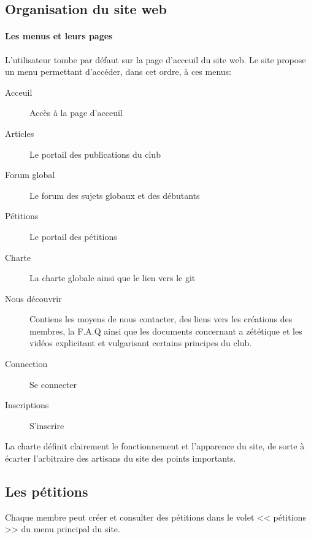 \documentclass[a4paper,12pt]{article}
\begin{document}
\subsection{Organisation du site web}
\paragraph{Les menus et leurs pages}
L'utilisateur tombe par défaut sur la page d'acceuil du site web. Le site propose un menu permettant d'accéder, dans cet ordre, à ces menus:
\begin{description}
 \item [Acceuil] Accès à la page d'acceuil
 \item [Articles] Le portail des publications du club
 \item [Forum global] Le forum des sujets globaux et des débutants
 \item [Pétitions] Le portail des pétitions
 \item [Charte] La charte globale ainsi que le lien vers le git
 \item [Nous découvrir] Contiens les moyens de nous contacter, des liens vers les créations des membres, la F.A.Q ainsi que les documents concernant a zététique et les vidéos explicitant et vulgarisant certains principes du club.
 \item [Connection] Se connecter
 \item [Inscriptions] S'inscrire
\end{description}


La charte définit clairement le fonctionnement et l'apparence du site, de sorte à écarter l'arbitraire des artisans du site des points importants.
\subsection{Les pétitions}
Chaque membre peut créer et consulter des pétitions dans le volet << pétitions >> du menu principal du site.
\end{document}
